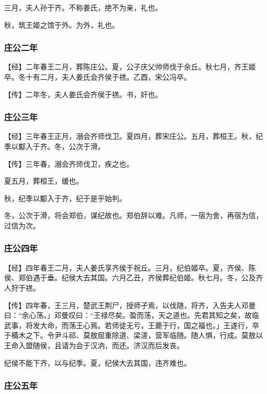 \documentclass[]{article}
\begin{document}
三月，夫人孙于齐。不称姜氏，绝不为亲，礼也。

秋，筑王姬之馆于外。为外，礼也。

\hypertarget{header-n362}{%
\subsubsection{庄公二年 }\label{header-n362}}

【经】二年春王二月，葬陈庄公。夏，公子庆父帅师伐于余丘。秋七月，齐王姬卒。冬十有二月，夫人姜氏会齐侯于禚。乙酉，宋公冯卒。

【传】二年冬，夫人姜氏会齐侯于禚。书，奸也。

\hypertarget{header-n367}{%
\subsubsection{庄公三年}\label{header-n367}}

【经】三年春王正月，溺会齐师伐卫。夏四月，葬宋庄公。五月，葬桓王。秋，纪季以酅入于齐。冬，公次于滑。

【传】三年春，溺会齐师伐卫，疾之也。

夏五月，葬桓王，缓也。

秋，纪季以酅入于齐，纪于是乎始判。

冬，公次于滑，将会郑伯，谋纪故也。郑伯辞以难。凡师，一宿为舍，再宿为信，过信为次。

\hypertarget{header-n375}{%
\subsubsection{庄公四年}\label{header-n375}}

【经】四年春王二月，夫人姜氏享齐侯于祝丘。三月，纪伯姬卒。夏，齐侯、陈侯、郑伯遇于垂。纪侯大去其国。六月乙丑，齐侯葬纪伯姬。秋七月。冬，公及齐人狩于禚。

【传】四年春，王三月，楚武王荆尸，授师孑焉，以伐随，将齐，入告夫人邓曼曰：``余心荡。」邓曼叹曰：``王禄尽矣。盈而荡，天之道也。先君其知之矣，故临武事，将发大命，而荡王心焉。若师徒无亏，王薨于行，国之福也。」王遂行，卒于樠木之下。令尹斗祁、莫敖屈重除道、梁溠，营军临随。随人惧，行成。莫敖以王命入盟随侯，且请为会于汉汭，而还。济汉而后发丧。

纪侯不能下齐，以与纪季。夏，纪侯大去其国，违齐难也。

\hypertarget{header-n381}{%
\subsubsection{庄公五年}\label{header-n381}}
\end{document}
